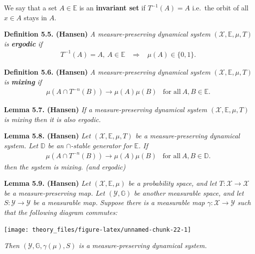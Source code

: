 \documentclass[a4paper,12pt,openany]{book}
\begin{document}
We say that a set \(A\in\mathbb{E}\) is an \textbf{invariant set} if \(T^{-1}(A)=A\) i.e.~the orbit of all \(x\in A\) stays in \(A\).

\textbf{Definition 5.5. (Hansen)} \emph{A measure-preserving dynamical system \((\mathcal{X},\mathbb{E},\mu,T)\) is \textbf{ergodic} if}
\begin{align*}
    T^{-1}(A)=A,\ A\in\mathbb{E} \hspace{10pt}\Rightarrow\hspace{10pt} \mu(A)\in\{0,1\}.\tag{5.7}
\end{align*}

\textbf{Definition 5.6. (Hansen)} \emph{A measure-preserving dynamical system \((\mathcal{X},\mathbb{E},\mu,T)\) is \textbf{mixing} if}
\begin{align*}
    \mu(A\cap T^{-n}(B))\to \mu(A)\mu(B)\hspace{10pt}\text{for all}\ A,B\in\mathbb{E}.\tag{5.8}
\end{align*}

\textbf{Lemma 5.7. (Hansen)} \emph{If a measure-preserving dynamical system \((\mathcal{X},\mathbb{E},\mu,T)\) is mixing then it is also ergodic.}

\textbf{Lemma 5.8. (Hansen)} \emph{Let \((\mathcal{X},\mathbb{E},\mu,T)\) be a measure-preserving dynamical system. Let \(\mathbb{D}\) be an \(\cap\)-stable generator for \(\mathbb{E}\). If}
\begin{align*}
        \mu(A\cap T^{-n}(B))\to \mu(A)\mu(B)\hspace{10pt}\text{for all}\ A,B\in\mathbb{D}.\tag{5.10}
\end{align*}
\emph{then the system is mixing. (and ergodic)}

\textbf{Lemma 5.9. (Hansen)} \emph{Let \((\mathcal{X},\mathbb{E},\mu)\) be a probability space, and let \(T : \mathcal{X}\to \mathcal{X}\) be a measure-preserving map. Let \((\mathcal{Y},\mathbb{G})\) be another measurable space, and let \(S : \mathcal{Y} \to \mathcal{Y}\) be a measurable map.}
\emph{Suppose there is a measurable map \(\gamma : \mathcal{X}\to \mathcal{Y}\) such that the following diagram commutes:}

\begin{center}\texttt{[image: theory\_files/figure-latex/unnamed-chunk-22-1]} \end{center}

\emph{Then \((\mathcal{Y},\mathbb{G},\gamma(\mu),S)\) is a measure-preserving dynamical system.}
\end{document}
